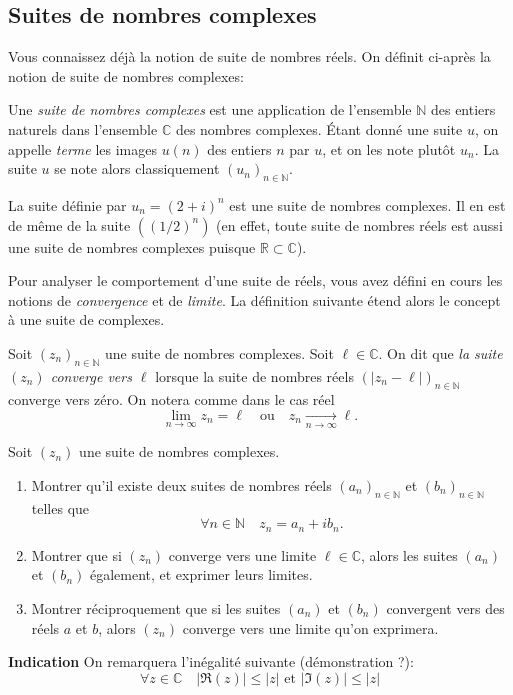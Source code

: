 \documentclass[12pt]{article}
\newcommand{\RR}{\mathbb R}
\newcommand{\CC}{\mathbb C}
\newcommand{\NN}{\mathbb N}
\theoremstyle{definition}
\begin{document}
\subsection*{Suites de nombres complexes}

Vous connaissez déjà la notion de suite de nombres réels. On définit ci-après la notion de suite de nombres complexes:
\begin{defn}
Une \textit{suite de nombres complexes} est une application de l'ensemble $\NN$ des entiers naturels dans l'ensemble $\CC$ des nombres complexes. Étant donné une suite $u$, on appelle \textit{terme} les images $u(n)$ des entiers $n$ par $u$, et on les note plutôt $u_n$. La suite $u$ se note alors classiquement $(u_n)_{n\in\NN}$.
\end{defn}

\begin{exem}
La suite définie par $u_n = (2+i)^n$ est une suite de nombres complexes. Il en est de même de la suite $\left((1/2)^n\right)$ (en effet, toute suite de nombres réels est aussi une suite de nombres complexes puisque $\RR\subset \CC$).
\end{exem}

Pour analyser le comportement d'une suite de réels, vous avez défini en cours les notions de \textit{convergence} et de \textit{limite}. La définition suivante étend alors le concept à une suite de complexes.

\begin{defn}
Soit $(z_n)_{n\in\NN}$ une suite de nombres complexes. Soit $\ell \in\CC$. On dit que \textit{la suite $(z_n)$ converge vers $\ell$} lorsque la suite de nombres réels
$\left(
|z_n -\ell|\right)_{n\in\NN}
$
converge vers zéro. On notera comme dans le cas réel
\[
\lim_{n\to\infty}z_n = \ell \quad\text{ou}\quad z_n \xrightarrow[n\to\infty]{}\ell.
\]
\end{defn}

\begin{exer}
Soit $(z_n)$ une suite de nombres complexes.\begin{enumerate}
	\item Montrer qu'il existe deux suites de nombres réels $(a_n)_{n\in\NN}$ et $(b_n)_{n\in\NN}$ telles que
	\[
	\forall n\in\NN \quad z_n = a_n + ib_n.
	\]
	\item Montrer que si $(z_n)$ converge vers une limite $\ell\in\CC$, alors les suites $(a_n)$ et $(b_n)$ également, et exprimer leurs limites.
	\item Montrer réciproquement que si les suites $(a_n)$ et $(b_n)$ convergent vers des réels $a$ et $b$, alors $(z_n)$ converge vers une limite qu'on exprimera.
\end{enumerate} 
\noindent\textbf{Indication} On remarquera l'inégalité suivante (démonstration ?):
\[
\forall z\in\CC \quad |\Re(z)| \leq |z|\text{ et }|\Im(z)| \leq |z|
\]
\end{exer}
\end{document}
